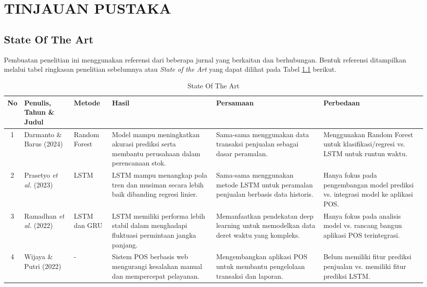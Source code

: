 \chapter[TINJAUAN PUSTAKA]{\\ TINJAUAN PUSTAKA}

\section{State Of The Art}
Pembuatan penelitian ini menggunakan referensi dari beberapa jurnal yang berkaitan dan berhubungan. Bentuk referensi ditampilkan melalui tabel ringkasan penelitian sebelumnya atau \textit{State of the Art} yang dapat dilihat pada Tabel \ref{tab:sota} berikut.

\begin{table}[htbp]
    \centering
    \caption{State Of The Art}
    \label{tab:sota}
    \fontsize{9pt}{11pt}\selectfont
    \begin{tabularx}{\textwidth}{|c|>{\raggedright\arraybackslash}p{2.3cm}|>{\raggedright\arraybackslash}X|>{\raggedright\arraybackslash}X|>{\raggedright\arraybackslash}X|>{\raggedright\arraybackslash}X|}
        \hline
        \textbf{No} & \textbf{Penulis, Tahun \& Judul} & \textbf{Metode} & \textbf{Hasil} & \textbf{Persamaan} & \textbf{Perbedaan} \\
        \hline
        1 & Darmanto \& Barus (2024) \cite{Darmanto2024} & Random Forest & Model mampu meningkatkan akurasi prediksi serta membantu perusahaan dalam perencanaan stok. & Sama-sama menggunakan data transaksi penjualan sebagai dasar peramalan. & Menggunakan Random Forest untuk klasifikasi/regresi vs. LSTM untuk runtun waktu. \\
        \hline
        2 & Prasetyo \textit{et al.} (2023) \cite{Prasetyo2023} & LSTM & LSTM mampu menangkap pola tren dan musiman secara lebih baik dibanding regresi linier. & Sama-sama menggunakan metode LSTM untuk peramalan penjualan berbasis data historis. & Hanya fokus pada pengembangan model prediksi vs. integrasi model ke aplikasi POS. \\
        \hline
        3 & Ramadhan \textit{et al.} (2022) \cite{Ramadhan2022} & LSTM dan GRU & LSTM memiliki performa lebih stabil dalam menghadapi fluktuasi permintaan jangka panjang. & Memanfaatkan pendekatan deep learning untuk memodelkan data deret waktu yang kompleks. & Hanya fokus pada analisis model vs. rancang bangun aplikasi POS terintegrasi. \\
        \hline
        4 & Wijaya \& Putri (2022) \cite{Wijaya2022} & - & Sistem POS berbasis web mengurangi kesalahan manual dan mempercepat pelayanan. & Mengembangkan aplikasi POS untuk membantu pengelolaan transaksi dan laporan. & Belum memiliki fitur prediksi penjualan vs. memiliki fitur prediksi LSTM. \\
        \hline
    \end{tabularx}
\end{table}

